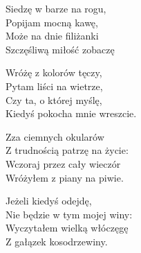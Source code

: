 \begin{text}
    Siedzę w barze na rogu,\\
    Popijam mocną kawę,\\
    Może na dnie filiżanki\\
    Szczęśliwą miłość zobaczę

    \vin Wróżę z kolorów tęczy,\\
    \vin Pytam liści na wietrze,\\
    \vin Czy ta, o której myślę,\\
    \vin Kiedyś pokocha mnie wreszcie.

    Zza ciemnych okularów\\
    Z trudnością patrzę na życie:\\
    Wczoraj przez cały wieczór\\
    Wróżyłem z piany na piwie.

    Jeżeli kiedyś odejdę,\\
    Nie będzie w tym mojej winy:\\
    Wyczytałem wielką włóczęgę\\
    Z gałązek kosodrzewiny.
\end{text}
\begin{chord}

\end{chord}